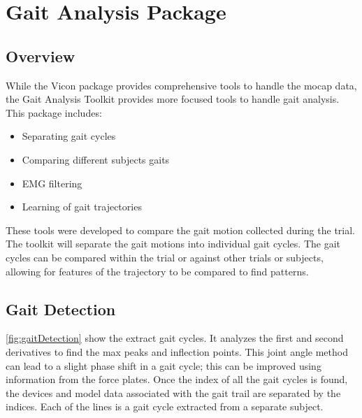 \section{Gait Analysis Package}

\subsection{Overview}
While the Vicon package provides comprehensive tools to handle the mocap data, the Gait Analysis Toolkit provides more focused tools to handle gait analysis. This package includes: 
\begin{itemize}[noitemsep]
    \item Separating gait cycles
    \item Comparing different subjects gaits
    \item EMG filtering
    \item Learning of gait trajectories
\end{itemize}

These tools were developed to compare the gait motion collected during the trial. The toolkit will separate the gait motions into individual gait cycles. The gait cycles can be compared within the trial or against other trials or subjects, allowing for features of the trajectory to be compared to find patterns. 

\subsection{Gait Detection}
\autoref{fig:gaitDetection} show the extract gait cycles. It analyzes the first and second derivatives to find the max peaks and inflection points. This joint angle method can lead to a slight phase shift in a gait cycle; this can be improved using information from the force plates. Once the index of all the gait cycles is found, the devices and model data associated with the gait trail are separated by the indices. Each of the lines is a gait cycle extracted from a separate subject. 

